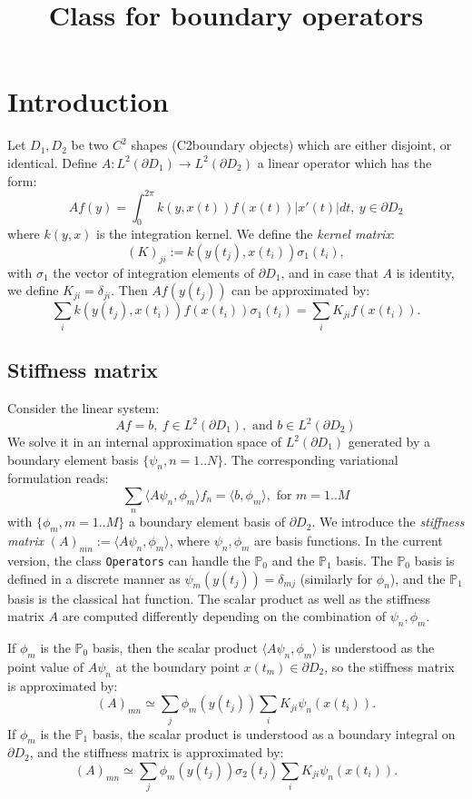 \documentclass{article}
\title{Class for boundary operators}
\begin{document}
\maketitle    
\def\Po{{ $\mathbb{P}_1$ }}   
\def\Pz{{ $\mathbb{P}_0$ }}   

\section{Introduction}
Let $D_1, D_2$ be two $C^2$ shapes (C2boundary objects) which are either disjoint, or identical. Define $A: L^2(\partial D_1) \rightarrow L^2(\partial D_2)$ a linear operator which has the form:
$$Af(y) = \int_0^{2\pi} k(y, x(t)) f(x(t)) |x'(t)| dt, \ y\in\partial
D_2 $$ where $k(y,x)$ is the integration kernel. We define the \emph{kernel matrix}:
$$(K)_{ji}:=k(y(t_j), x(t_i))\sigma_1(t_i),$$
with $\sigma_1$ the vector of integration elements of $\partial D_1$, and in case that $A$ is identity, we define $K_{ji}=\delta_{ji}$. Then $Af(y(t_j))$ can be approximated by:
$$\sum_i k(y(t_j), x(t_i)) f(x(t_i)) \sigma_1(t_i) = \sum_i K_{ji}f(x(t_i)).$$

\subsection{Stiffness matrix}
Consider the linear system:
$$Af = b, \ f\in L^2(\partial D_1), \mbox{ and } b\in L^2(\partial D_2)$$
We solve it in an internal approximation space of $L^2(\partial D_1)$ generated by a boundary element basis $\{\psi_n, n=1..N\}$. The corresponding variational formulation reads:
$$\sum_n \langle A\psi_n, \phi_m \rangle f_n = \langle b, \phi_m\rangle, \mbox{ for } m=1..M$$
with $\{\phi_m, m=1..M\}$ a boundary element basis of $\partial D_2$.  We introduce the \emph{stiffness matrix} $(A)_{mn}:=\langle A\psi_n, \phi_m \rangle$, where $\psi_n, \phi_m$ are basis functions. In the current version, the class \texttt{Operators} can handle the \Pz and the \Po basis. The \Pz basis is defined in a discrete manner as $\psi_m(y(t_j))=\delta_{mj}$ (similarly for $\phi_n$), and the \Po basis is the classical hat function. The scalar product as well as the stiffness matrix $A$ are computed differently depending on the combination of $\psi_n, \phi_m$.

If $\phi_m$ is the \Pz basis, then the scalar product $\langle A\psi_n, \phi_m \rangle$ is understood as the point value of $A\psi_n$ at the boundary point $x(t_m)\in\partial D_2$, so the stiffness matrix is approximated by:
$$(A)_{mn} \simeq \sum_j\phi_m(y(t_j))\sum_i K_{ji} \psi_n(x(t_i)).$$ 
If $\phi_m$ is the \Po basis, the scalar product is understood as a boundary integral on $\partial D_2$, and the stiffness matrix is approximated by:
$$(A)_{mn} \simeq \sum_j\phi_m(y(t_j))\sigma_2(t_j)\sum_i K_{ji} \psi_n(x(t_i)).$$
\end{document}
